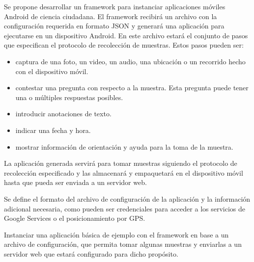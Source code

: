 Se propone desarrollar un framework para instanciar aplicaciones móviles Android de ciencia ciudadana. El framework recibirá un archivo con la configuración requerida en formato JSON y generará una aplicación para ejecutarse en un dispositivo Android. En este archivo estará el conjunto de pasos que especifican el protocolo de recolección de muestras. Estos pasos pueden ser:
			\begin{itemize}
				\item captura de una foto, un video, un audio, una ubicación o un recorrido hecho con el dispositivo móvil.
				\item contestar una pregunta con respecto a la muestra. Esta pregunta puede tener una o múltiples respuestas posibles.
				\item introducir anotaciones de texto.
				\item indicar una fecha y hora.
				\item mostrar información de orientación y ayuda para la toma de la muestra.
			\end{itemize}

La aplicación generada servirá para tomar muestras siguiendo el protocolo de recolección especificado y las almacenará y empaquetará en el dispositivo móvil hasta que pueda ser enviada a un servidor web.
		
Se define el formato del archivo de configuración de la aplicación y la información adicional necesaria, como pueden ser credenciales para acceder a los servicios de Google Services o el posicionamiento por GPS.

Instanciar una aplicación básica de ejemplo con el framework en base a un archivo de configuración, que permita tomar algunas muestras y enviarlas a un servidor web que estará configurado para dicho propósito.
			